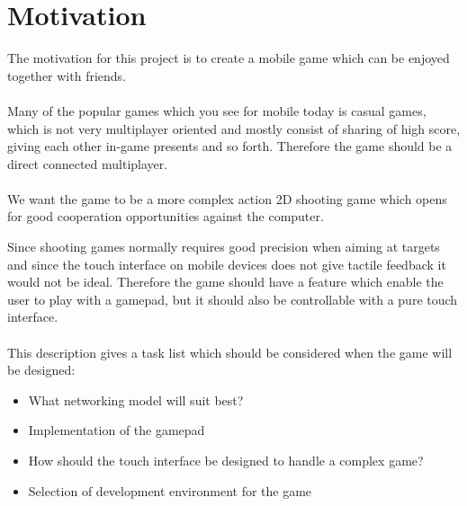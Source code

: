 \section{Motivation}
The motivation for this project is to create a mobile game which can be enjoyed together with friends.\\\\
Many of the popular games which you see for mobile today is casual games, which is not very multiplayer oriented and mostly consist of sharing of high score, giving each other in-game presents and so forth.
Therefore the game should be a direct connected multiplayer.\\\\
We want the game to be a more complex action 2D shooting game which opens for good cooperation opportunities against the computer.

Since shooting games normally requires good precision when aiming at targets and since the touch interface on mobile devices does not give tactile feedback it would not be ideal. Therefore the game should have a feature which enable the user to play with a gamepad, but it should also be controllable with a pure touch interface.\\\\
This description gives a task list which should be considered when the game will be designed:
\begin{itemize}
\item What networking model will suit best?
\item Implementation of the gamepad
\item How should the touch interface be designed to handle a complex game? 
\item Selection of development environment for the game
\end{itemize}